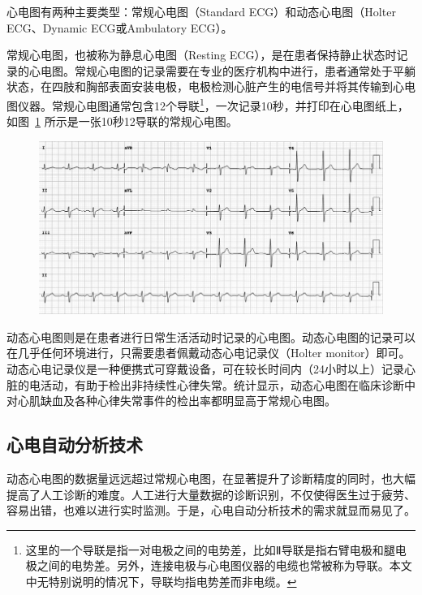 心电图有两种主要类型：常规心电图（Standard ECG）和动态心电图（Holter ECG、Dynamic ECG或Ambulatory ECG）。

常规心电图，也被称为静息心电图（Resting ECG），是在患者保持静止状态时记录的心电图。常规心电图的记录需要在专业的医疗机构中进行，患者通常处于平躺状态，在四肢和胸部表面安装电极，电极检测心脏产生的电信号并将其传输到心电图仪器。常规心电图通常包含12个导联\footnote{这里的一个导联是指一对电极之间的电势差，比如Ⅱ导联是指右臂电极和腿电极之间的电势差。另外，连接电极与心电图仪器的电缆也常被称为导联。本文中无特别说明的情况下，导联均指电势差而非电缆。}，一次记录10秒，并打印在心电图纸上，如图~\ref{fig:ecg-paper-example} 所示是一张10秒12导联的常规心电图。

\begin{figure}[ht]
    \includegraphics[width=\textwidth]{../assets/ecg-paper-example}
    \label{fig:ecg-paper-example}
\end{figure}

动态心电图则是在患者进行日常生活活动时记录的心电图。动态心电图的记录可以在几乎任何环境进行，只需要患者佩戴动态心电记录仪（Holter monitor）即可。动态心电记录仪是一种便携式可穿戴设备，可在较长时间内（24小时以上）记录心脏的电活动，有助于检出非持续性心律失常。统计显示，动态心电图在临床诊断中对心肌缺血及各种心律失常事件的检出率都明显高于常规心电图\cite{zhengDongtaixindiantuyuchangguixindiantuzhenduanguanxinbinghuanzhexinjiquexiejixinlushichangdelinchuangxiaoguobijiao2011}。

\subsection{心电自动分析技术}\label{subsec:automatic-analysis}

动态心电图的数据量远远超过常规心电图，在显著提升了诊断精度的同时，也大幅提高了人工诊断的难度。人工进行大量数据的诊断识别，不仅使得医生过于疲劳、容易出错，也难以进行实时监测。于是，心电自动分析技术的需求就显而易见了。


